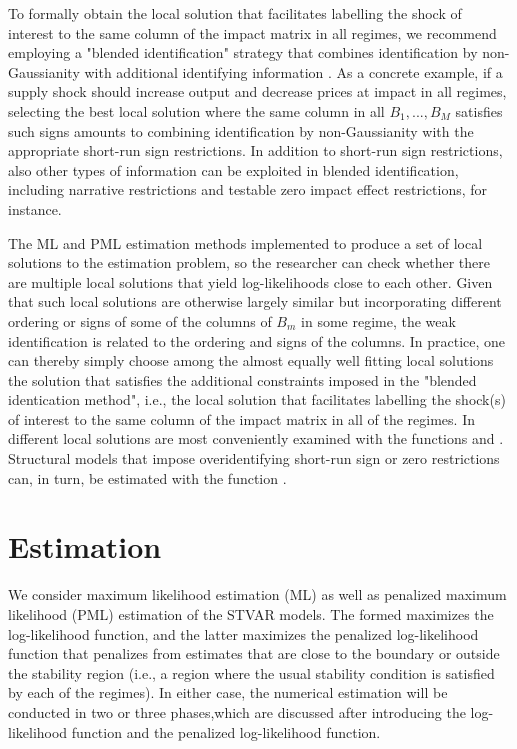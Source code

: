\documentclass[nojss]{jss}
\begin{document}
To formally obtain the local solution that facilitates labelling the shock of interest to the same column of the impact matrix in all regimes, we recommend employing a "blended identification" strategy that combines identification by non-Gaussianity with additional identifying information \citep[cf.][]{Carriero+Marcellino+Tornese:2024}. As a concrete example, if a supply shock should increase output and decrease prices at impact in all regimes, selecting the best local solution where the same column in all $B_1,...,B_M$ satisfies such signs amounts to combining identification by non-Gaussianity with the appropriate short-run sign restrictions. In addition to short-run sign restrictions, also other types of information can be exploited in blended identification, including narrative restrictions and testable zero impact effect restrictions, for instance.

The ML and PML estimation methods implemented to  produce a set of local solutions to the estimation problem, so the researcher can check whether there are multiple local solutions that yield log-likelihoods close to each other. Given that such local solutions are otherwise largely similar but incorporating different ordering or signs of some of the columns of $B_m$ in some regime, the weak identification is related to the ordering and signs of the columns. In practice, one can thereby simply choose among the almost equally well fitting local solutions the solution that satisfies the additional constraints imposed in the "blended identication method", i.e., the local solution that facilitates labelling the shock(s) of interest to the same column of the impact matrix in all of the regimes.
In  different local solutions are most conveniently examined with the functions  and . Structural models that impose overidentifying short-run sign or zero restrictions can, in turn, be estimated with the function .

\section{Estimation}\label{sec:estimation}
We consider maximum likelihood estimation (ML) as well as penalized maximum likelihood (PML) estimation of the STVAR models. The formed maximizes the log-likelihood function, and the latter maximizes the penalized log-likelihood function that penalizes from estimates that are close to the boundary or outside the stability region (i.e., a region where the usual stability condition is satisfied by each of the regimes). In either case, the numerical estimation will be conducted in two or three phases,which are discussed after introducing the log-likelihood function and the penalized log-likelihood function.
\end{document}
